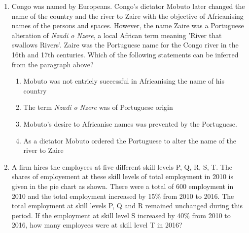 \documentclass[journal,12pt,onecolumn]{IEEEtran}
\theoremstyle{remark}
\begin{document}
\begin{enumerate}
    \item \label{Q8} Congo was named by Europeans. Congo's dictator Mobuto later changed the name of the country and the river to Zaire with the objective of Africanising names of the persons and spaces. However, the name Zaire was a Portuguese alteration of \textit{Nzadi o Nzere}, a local African term meaning 'River that swallows Rivers'. Zaire was the Portuguese name for the Congo river in the 16th and 17th centuries.
    Which of the following statements can be inferred from the paragraph above?
    \begin{enumerate}
        \item Mobuto was not entriely successful in Africanising the name of his country
        \item The term \textit{Nzadi o Nzere} was of Portuguese origin
        \item Mobuto's desire to Africanise names was prevented by the Portuguese.
        \item As a dictator Mobuto ordered the Portuguese to alter the name of the river to Zaire
    \end{enumerate}

    \item \label{Q9}A firm hires the employees at five different skill levels P, Q, R, S, T. The shares of employement at these skill levels of total employment in 2010 is given in the pie chart as shown. There were a total of 600 employment in 2010 and the total employment increased by 15\% from 2010 to 2016. The total employment at skill levels P, Q and R remained unchanged during this period. If the employment at skill level S increased by 40\% from 2010 to 2016, how many employees were at skill level T in 2016?
    \begin{figure}[!ht]
\centering
{}%


\end{figure}
\end{enumerate}
\end{document}
